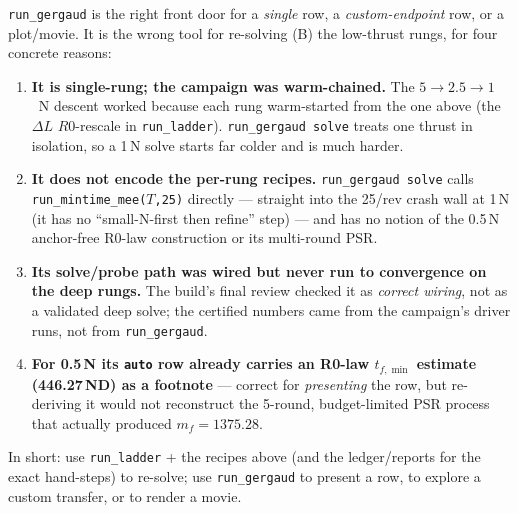\documentclass[11pt]{article}
\newcommand{\code}[1]{\texttt{\small #1}}
\newcommand{\file}[1]{\texttt{\small #1}}
\newcommand{\dL}{\Delta L}
\begin{document}
\file{run\_gergaud} is the right front door for a \emph{single} row, a
\emph{custom-endpoint} row, or a plot/movie. It is the wrong tool for re-solving
(B) the low-thrust rungs, for four concrete reasons:
\begin{enumerate}[leftmargin=1.4em]
\item \textbf{It is single-rung; the campaign was warm-chained.} The
$5\to2.5\to1$~N descent worked because each rung warm-started from the one above
(the $\dL$ $R0$-rescale in \file{run\_ladder}). \file{run\_gergaud solve} treats
one thrust in isolation, so a 1\,N solve starts far colder and is much harder.
\item \textbf{It does not encode the per-rung recipes.} \file{run\_gergaud solve}
calls \file{run\_mintime\_mee($T$,25)} directly --- straight into the 25/rev
crash wall at 1\,N (it has no ``small-N-first then refine'' step) --- and has no
notion of the 0.5\,N anchor-free R0-law construction or its multi-round PSR.
\item \textbf{Its solve/probe path was wired but never run to convergence on the
deep rungs.} The build's final review checked it as \emph{correct wiring}, not as
a validated deep solve; the certified numbers came from the campaign's driver
runs, not from \file{run\_gergaud}.
\item \textbf{For 0.5\,N its \code{auto} row already carries an R0-law $t_{f,\min}$
estimate (446.27\,ND) as a footnote} --- correct for \emph{presenting} the row,
but re-deriving it would not reconstruct the 5-round, budget-limited PSR process
that actually produced $m_f=1375.28$.
\end{enumerate}
In short: use \file{run\_ladder} + the recipes above (and the ledger/reports for
the exact hand-steps) to re-solve; use \file{run\_gergaud} to present a row, to
explore a custom transfer, or to render a movie.
\end{document}
